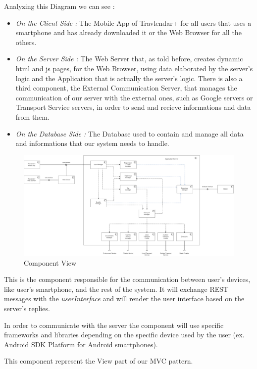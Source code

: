 Analyzing this Diagram we can see :
\begin{itemize}
	\setlength{\leftskip}{0.5cm}
	\item \emph{On the Client Side : }The Mobile App of Travlendar+ for all users that uses a smartphone and has already downloaded it or the Web Browser for all the others.
	\item \emph{On the Server Side : }The Web Server that, as told before, creates dynamic html and js pages, for the Web Browser, using data elaborated by the server's logic and the Application that is actually the server's logic. There is also a third component, the External Communication Server, that manages the communication of our server with the external ones, such as Google servers or Transport Service servers, in order to send and recieve informations and data from them.
	\item \emph{On the Database Side : }The Database used to contain and manage all data and informations that our system needs to handle.
\end{itemize}

\begin{figure}[H]
	\centering
	\includegraphics[scale=0.17]{Images/Architecture/Components_View}
	\caption{Component View}
\end{figure}
This is the component responsible for the communication between user’s devices, like user’s smartphone, and the rest of the system. It will exchange REST messages with the \emph{userInterface} and will render the user interface based on the server’s replies.\par
In order to communicate with the server the component will use specific frameworks and libraries depending on the specific device used by the user (ex. Android SDK Platform for Android smartphones).\par
This component represent the View part of our MVC pattern.

